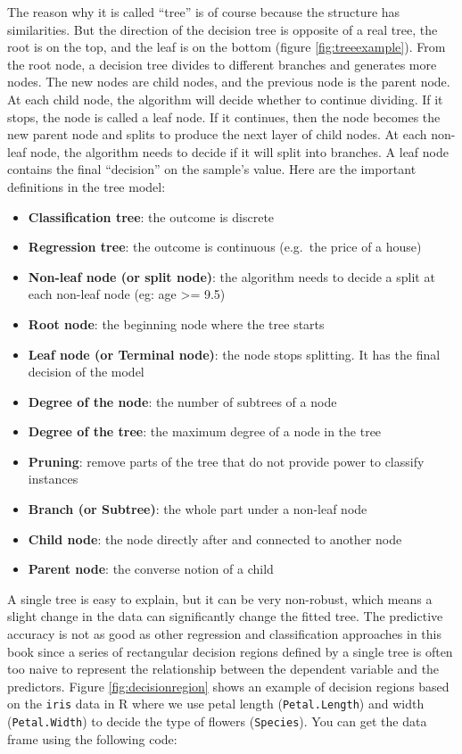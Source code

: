 \documentclass[
  12pt,
]{krantz}
\providecommand{\tightlist}{%
  \setlength{\itemsep}{0pt}\setlength{\parskip}{0pt}}
\begin{document}
The reason why it is called ``tree'' is of course because the structure has similarities. But the direction of the decision tree is opposite of a real tree, the root is on the top, and the leaf is on the bottom (figure \ref{fig:treeexample}). From the root node, a decision tree divides to different branches and generates more nodes. The new nodes are child nodes, and the previous node is the parent node. At each child node, the algorithm will decide whether to continue dividing. If it stops, the node is called a leaf node. If it continues, then the node becomes the new parent node and splits to produce the next layer of child nodes. At each non-leaf node, the algorithm needs to decide if it will split into branches. A leaf node contains the final ``decision'' on the sample's value. Here are the important definitions in the tree model:

\begin{itemize}
\tightlist
\item
  \textbf{Classification tree}: the outcome is discrete
\item
  \textbf{Regression tree}: the outcome is continuous (e.g.~the price of a house)
\item
  \textbf{Non-leaf node (or split node)}: the algorithm needs to decide a split at each non-leaf node (eg: age \textgreater= 9.5)
\item
  \textbf{Root node}: the beginning node where the tree starts
\item
  \textbf{Leaf node (or Terminal node)}: the node stops splitting. It has the final decision of the model
\item
  \textbf{Degree of the node}: the number of subtrees of a node
\item
  \textbf{Degree of the tree}: the maximum degree of a node in the tree
\item
  \textbf{Pruning}: remove parts of the tree that do not provide power to classify instances
\item
  \textbf{Branch (or Subtree)}: the whole part under a non-leaf node
\item
  \textbf{Child node}: the node directly after and connected to another node
\item
  \textbf{Parent node}: the converse notion of a child
\end{itemize}

A single tree is easy to explain, but it can be very non-robust, which means a slight change in the data can significantly change the fitted tree. The predictive accuracy is not as good as other regression and classification approaches in this book since a series of rectangular decision regions defined by a single tree is often too naive to represent the relationship between the dependent variable and the predictors. Figure \ref{fig:decisionregion} shows an example of decision regions based on the \texttt{iris} data in R where we use petal length (\texttt{Petal.Length}) and width (\texttt{Petal.Width}) to decide the type of flowers (\texttt{Species}). You can get the data frame using the following code:
\end{document}
